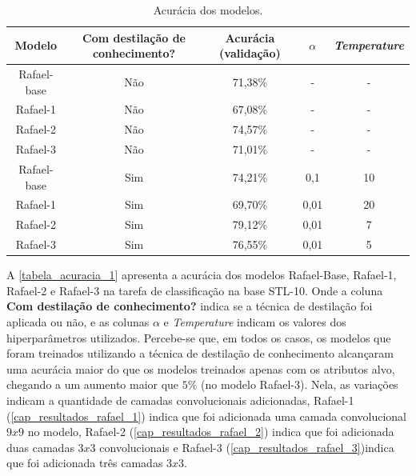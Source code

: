 \begin{center}
\begin{table}[htb]
\centering
\ABNTEXfontereduzida
\caption[Acurácia dos modelos]{Acurácia dos modelos.}
\label{tabela_acuracia_1}
\begin{tabular}{ |c|c|c|c|c| }
	\hline
	\textbf{Modelo} & \textbf{Com destilação de conhecimento?}  & \textbf{Acurácia (validação)}
		   & \textbf{$\alpha$} & \textbf{\textit{Temperature}} \\
	\hline
	Rafael-base 	& 	Não 	& 	71,38\%	& 	- 	& 	-	 \\
	Rafael-1 	& 	Não 	& 	67,08\%	& 	- 	& 	-	 \\
	Rafael-2 	& 	Não 	& 	74,57\%	& 	- 	& 	-	 \\
	Rafael-3 	& 	Não 	& 	71,01\%	& 	- 	& 	-	 \\
	Rafael-base 	& 	Sim 	& 	74,21\%	& 	0,1 	& 	10	 \\
	Rafael-1 	& 	Sim 	& 	69,70\%	& 	0,01 	& 	20	 \\
	Rafael-2 	& 	Sim 	& 	79,12\%	& 	0,01 	& 	7	 \\
	Rafael-3 	& 	Sim 	& 	76,55\%	& 	0,01 	& 	5	 \\
	\hline
\end{tabular}
\end{table}
\end{center}

A \autoref{tabela_acuracia_1} apresenta a acurácia dos modelos Rafael-Base, Rafael-1, Rafael-2 e Rafael-3 na tarefa de
classificação na base STL-10.
Onde a coluna \textbf{Com destilação de conhecimento?} indica se a técnica de destilação foi aplicada
ou não, e as colunas $\alpha$ e \textit{Temperature} indicam os valores dos hiperparâmetros utilizados.
Percebe-se que, em todos os casos, os modelos que foram treinados utilizando a técnica de destilação de conhecimento alcançaram
uma acurácia maior do que os modelos treinados apenas com os atributos alvo, chegando a um aumento maior que $5\%$ (no modelo
Rafael-3).
Nela, as variações indicam a quantidade de camadas convolucionais adicionadas, Rafael-1
(\autoref{cap_resultados_rafael_1}) indica que foi adicionada uma camada convolucional $9x9$ no modelo, Rafael-2
(\autoref{cap_resultados_rafael_2}) indica que foi adicionada duas camadas $3x3$ convolucionais e Rafael-3
(\autoref{cap_resultados_rafael_3})indica que foi adicionada três camadas $3x3$.


